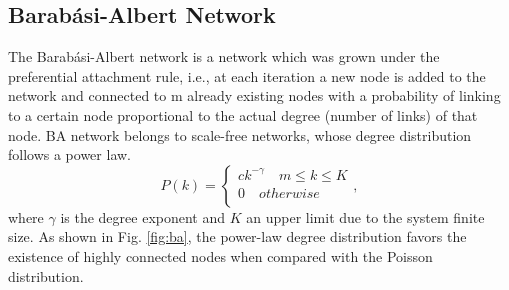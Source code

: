 \documentclass[11pt]{article}
\begin{document}
\subsection{Barab\'{a}si-Albert Network}
The Barab\'{a}si-Albert network is a network which was grown under the preferential attachment rule, i.e., at each iteration a new node is added to the network and connected to m already existing nodes with a probability of linking to a certain node proportional to the actual degree (number of links) of that node. BA network belongs to scale-free networks,  whose degree distribution follows a power law.
\begin{equation}
    P(k) = \left\{
                \begin{array}{ll}
                  ck^{-\gamma} \quad m \le k \le K\\
                  0 \quad otherwise\\
                \end{array}
              \right. ,
  \label{eqn:bapk}
\end{equation}
where $\gamma$ is the degree exponent and $K$ an upper limit due to the system finite size. As shown in Fig. \ref{fig:ba}, the power-law degree distribution favors the existence of highly connected nodes when compared with the Poisson distribution.
\end{document}
